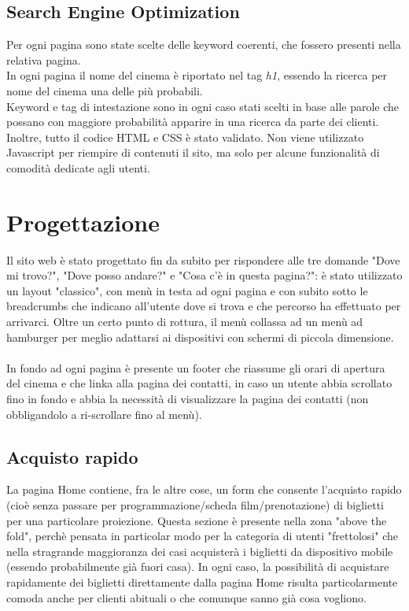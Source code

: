 \documentclass[a4paper, 12pt]{article}
\begin{document}
\subsection{Search Engine Optimization}
Per ogni pagina sono state scelte delle keyword coerenti, che fossero presenti nella relativa pagina.\\
In ogni pagina il nome del cinema è riportato nel tag \textit{h1}, essendo la ricerca per nome del cinema una delle più probabili.\\
Keyword e tag di intestazione sono in ogni caso stati scelti in base alle parole che possano con maggiore probabilità apparire in una ricerca da parte dei clienti.
Inoltre, tutto il codice HTML e CSS è stato validato.
Non viene utilizzato Javascript per riempire di contenuti il sito, ma solo per alcune funzionalità di comodità dedicate agli utenti.
\newpage
\section{Progettazione}
Il sito web è stato progettato fin da subito per rispondere alle tre domande "Dove mi trovo?", "Dove posso andare?" e "Cosa c'è in questa pagina?": è stato utilizzato un layout "classico", con menù in testa ad ogni pagina e con subito sotto le breadcrumbs che indicano all'utente dove si trova e che percorso ha effettuato per arrivarci. Oltre un certo punto di rottura, il menù collassa ad un menù ad hamburger per meglio adattarsi ai dispositivi con schermi di piccola dimensione.\\
\\In fondo ad ogni pagina è presente un footer che riassume gli orari di apertura del cinema e che linka alla pagina dei contatti, in caso un utente abbia scrollato fino in fondo e abbia la necessità di visualizzare la pagina dei contatti (non obbligandolo a ri-scrollare fino al menù).
\subsection{Acquisto rapido}
La pagina Home contiene, fra le altre cose, un form che consente l'acquisto rapido (cioè senza passare per programmazione/scheda film/prenotazione) di biglietti per una particolare proiezione. Questa sezione è presente nella zona "above the fold", perchè pensata in particolar modo per la categoria di utenti "frettolosi" che nella stragrande maggioranza dei casi acquisterà i biglietti da dispositivo mobile (essendo probabilmente già fuori casa). In ogni caso, la possibilità di acquistare rapidamente dei biglietti direttamente dalla pagina Home risulta particolarmente comoda anche per clienti abituali o che comunque sanno già cosa vogliono.
\end{document}
